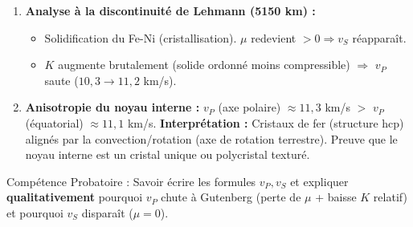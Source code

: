 \documentclass[11pt]{article}
\newcommand{\cle}[1]{{\popxbold\color{popdark}#1}}
\begin{document}
\begin{methode}
\begin{enumerate}
\begin{itemize}
        \item $K$ diminue (le fer liquide est plus compressible que le silicate solide sous cette pression) $\Rightarrow$ $v_P$ \textbf{chute} ($13,7 \rightarrow 8,1$ km/s).
    \end{itemize}
    \item \textbf{Analyse à la discontinuité de Lehmann (5150 km) :}
    \begin{itemize}
        \item Solidification du Fe-Ni (cristallisation). $\mu$ redevient $> 0 \Rightarrow v_S$ réapparaît.
        \item $K$ augmente brutalement (solide ordonné moins compressible) $\Rightarrow$ $v_P$ saute ($10,3 \rightarrow 11,2$ km/s).
    \end{itemize}
    \item \textbf{Anisotropie du noyau interne :} $v_P$ (axe polaire) $\approx 11,3$ km/s $>$ $v_P$ (équatorial) $\approx 11,1$ km/s. \textbf{Interprétation :} Cristaux de fer (structure hcp) alignés par la convection/rotation (axe de rotation terrestre). Preuve que le noyau interne est un cristal unique ou polycristal texturé.
\end{enumerate}
\cle{Compétence Probatoire :} Savoir écrire les formules $v_P, v_S$ et expliquer \textbf{qualitativement} pourquoi $v_P$ chute à Gutenberg (perte de $\mu$ + baisse $K$ relatif) et pourquoi $v_S$ disparaît ($\mu=0$).
\end{methode}
\end{document}
